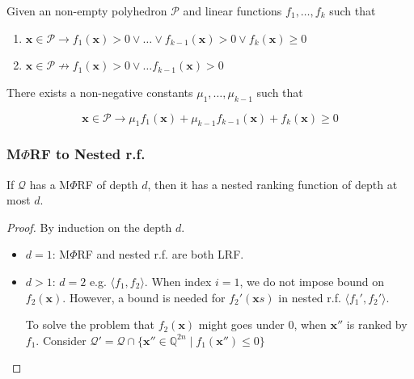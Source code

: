 \documentclass[11pt]{beamer}
\begin{document}
\begin{frame}
\begin{lemma}[0]
Given an non-empty polyhedron $\mathcal{P}$ and linear functions $f_1, \ldots , f_k$ such that 

\begin{enumerate}
\item $\textbf{x}\in \mathcal{P}\rightarrow f_1(  \textbf{x}) > 0 \vee \ldots \vee f_{k-1}(\textbf{x}) > 0 \vee f_{k}(\textbf{x}) \ge 0$

\item $\textbf{x} \in \mathcal{P} \not\rightarrow f_1(\textbf{x}) > 0 \vee \ldots f_{k-1}(\textbf{x}) > 0$

\end{enumerate}
There exists a non-negative constants $\mu_1, \ldots, \mu_{k-1}$ such that 

\[\textbf{x}\in \mathcal{P} \rightarrow \mu_1f_1(\textbf{x}) + \mu_{k-1}f_{k-1}(\textbf{x}) + f_k(\textbf{x}) \ge 0\]
\end{lemma}


\end{frame}


\begin{frame}\frametitle{M$\Phi$RF to Nested r.f.}
\begin{theorem}[1]
If $\mathcal{Q}$ has a M$\Phi$RF of depth $d$, then it has a nested ranking function of depth at most $d$.


\end{theorem}

\begin{proof}
By induction on the depth $d$.
\begin{itemize}
\item $d = 1$: M$\Phi$RF and nested r.f. are both LRF.
\item $d > 1$: $d = 2$ e.g.
$\langle f_1, f_2\rangle$. When index $i = 1$, we do not impose bound on $f_2(\textbf{x})$. However, a bound is needed for $f_2'(\textbf{x}s)$ in nested r.f. $\langle f_1', f_2'\rangle$.

To solve the problem that $f_2(\textbf{x})$ might goes under $0$, when $\textbf{x}''$ is ranked by $f_1$. Consider  $\mathcal{Q}' = \mathcal{Q}\cap \{\textbf{x}''\in \mathbb{Q}^{2n}\mid f_1(\textbf{x}'') \le 0\}$


\end{itemize}


\end{proof}

\end{frame}
\end{document}
